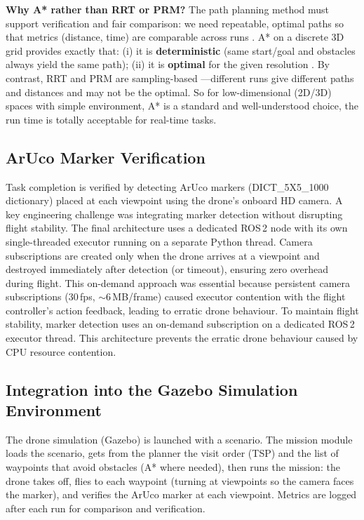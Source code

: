 \documentclass[11pt,a4paper]{article}
\begin{document}
\textbf{Why A* rather than RRT or PRM?} The path planning method must support verification and fair comparison: we need repeatable, optimal paths so that metrics (distance, time) are comparable across runs . A* on a discrete 3D grid provides exactly that: (i) it is \textbf{deterministic} (same start/goal and obstacles always yield the same path); (ii) it is \textbf{optimal} for the given resolution . By contrast, RRT and PRM are sampling-based ---different runs give different paths and distances and may not be the optimal. So for low-dimensional (2D/3D) spaces with simple environment, A* is a standard and well-understood choice, the run time is totally acceptable for real-time tasks.

\subsection{ArUco Marker Verification}

Task completion is verified by detecting ArUco markers (DICT\_5X5\_1000 dictionary) placed at each viewpoint using the drone's onboard HD camera. A key engineering challenge was integrating marker detection without disrupting flight stability. The final architecture uses a dedicated ROS\,2 node with its own single-threaded executor running on a separate Python thread. Camera subscriptions are created only when the drone arrives at a viewpoint and destroyed immediately after detection (or timeout), ensuring zero overhead during flight. This on-demand approach was essential because persistent camera subscriptions (30\,fps, $\sim$6\,MB/frame) caused executor contention with the flight controller's action feedback, leading to erratic drone behaviour.
To maintain flight stability, marker detection uses an on-demand subscription on a dedicated ROS\,2 executor thread. This architecture prevents the erratic drone behaviour caused by CPU resource contention.

\subsection{Integration into the Gazebo Simulation Environment}

The drone simulation (Gazebo) is launched with a scenario. The mission module loads the scenario, gets from the planner the visit order (TSP) and the list of waypoints that avoid obstacles (A* where needed), then runs the mission: the drone takes off, flies to each waypoint (turning at viewpoints so the camera faces the marker), and verifies the ArUco marker at each viewpoint. Metrics are logged after each run for comparison and verification.
\end{document}
